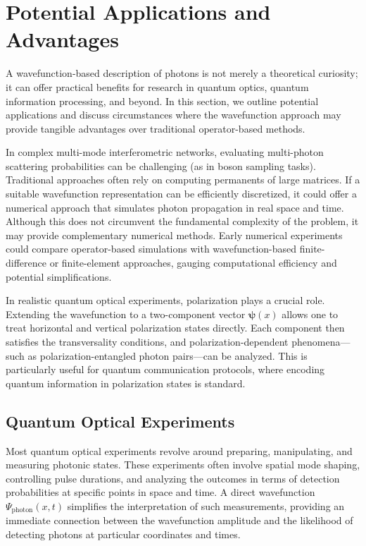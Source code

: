 \documentclass[aps,prl,twocolumn,showpacs,showkeys,superscriptaddress,amsmath,amssymb]{revtex4-2}
\begin{document}

\section{Potential Applications and Advantages}
\label{sec:applications}

A wavefunction-based description of photons is not merely a theoretical curiosity; it can offer practical benefits for research in quantum optics, quantum information processing, and beyond. In this section, we outline potential applications and discuss circumstances where the wavefunction approach may provide tangible advantages over traditional operator-based methods.


In complex multi-mode interferometric networks, evaluating multi-photon scattering probabilities can be challenging (as in boson sampling tasks). Traditional approaches often rely on computing permanents of large matrices. If a suitable wavefunction representation can be efficiently discretized, it could offer a numerical approach that simulates photon propagation in real space and time. Although this does not circumvent the fundamental complexity of the problem, it may provide complementary numerical methods. Early numerical experiments could compare operator-based simulations with wavefunction-based finite-difference or finite-element approaches, gauging computational efficiency and potential simplifications.


In realistic quantum optical experiments, polarization plays a crucial role. Extending the wavefunction to a two-component vector $\bm{\psi}(x)$ allows one to treat horizontal and vertical polarization states directly. Each component then satisfies the transversality conditions, and polarization-dependent phenomena—such as polarization-entangled photon pairs—can be analyzed. This is particularly useful for quantum communication protocols, where encoding quantum information in polarization states is standard.

\subsection{Quantum Optical Experiments}

Most quantum optical experiments revolve around preparing, manipulating, and measuring photonic states. These experiments often involve spatial mode shaping, controlling pulse durations, and analyzing the outcomes in terms of detection probabilities at specific points in space and time. A direct wavefunction $\Psi_{\text{photon}}(x,t)$ simplifies the interpretation of such measurements, providing an immediate connection between the wavefunction amplitude and the likelihood of detecting photons at particular coordinates and times.
\end{document}
